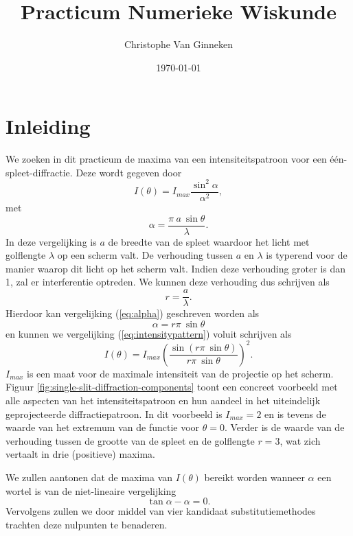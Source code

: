 \documentclass[12pt,a4paper]{article}
\title{\vspace{-6ex}Practicum Numerieke Wiskunde\vspace{-1.5ex}}
\author{Christophe Van Ginneken}
\date{\vspace{-1.5ex}\today}
\begin{document}
\maketitle
\vspace{-2cm}
\section{Inleiding}

We zoeken in dit practicum de maxima van een intensiteitspatroon voor een \'e\'en-spleet-diffractie. Deze wordt gegeven door
\begin{equation} \label{eq:intensitypattern}
I(\theta) = I_{max} \frac{\sin^2 \alpha}{\alpha^2},
\end{equation}
met
\begin{equation} \label{eq:alpha}
\alpha = \frac{\pi \ a \ \sin \theta}{\lambda}.
\end{equation}
In deze vergelijking is $a$ de breedte van de spleet waardoor het licht met golflengte $\lambda$ op een scherm valt. De verhouding tussen $a$ en $\lambda$ is typerend voor de manier waarop dit licht op het scherm valt. Indien deze verhouding groter is dan 1, zal er interferentie optreden. We kunnen deze verhouding dus schrijven als
\begin{equation} \label{eq:a/lambda}
r=\frac{a}{\lambda}.
\end{equation}
Hierdoor kan vergelijking (\ref{eq:alpha}) geschreven worden als
\begin{equation} \label{eq:alpha-simple}
\alpha = r \pi \ \sin\theta
\end{equation}
en kunnen we vergelijking (\ref{eq:intensitypattern}) voluit schrijven als
\begin{equation} \label{eq:intensitypattern-full}
I(\theta) = I_{max} \left(\frac{\sin(r \pi \ \sin \theta)}{r \pi \ \sin \theta}\right)^2.
\end{equation}
$I_{max}$ is een maat voor de maximale intensiteit van de projectie op het scherm. Figuur \ref{fig:single-slit-diffraction-components} toont een concreet voorbeeld met alle aspecten van het intensiteitspatroon en hun aandeel in het uiteindelijk geprojecteerde diffractiepatroon. In dit voorbeeld is $I_{max} = 2$ en is tevens de waarde van het extremum van de functie voor $\theta = 0$. Verder is de waarde van de verhouding tussen de grootte van de spleet en de golflengte $r=3$, wat zich vertaalt in drie (positieve) maxima.

We zullen aantonen dat de maxima van $I(\theta)$ bereikt worden wanneer $\alpha$ een wortel is van de niet-lineaire vergelijking
\begin{equation} \label{eq:non-linear}
\tan\alpha - \alpha = 0.
\end{equation}
Vervolgens zullen we door middel van vier kandidaat substitutiemethodes trachten deze nulpunten te benaderen.
\end{document}
